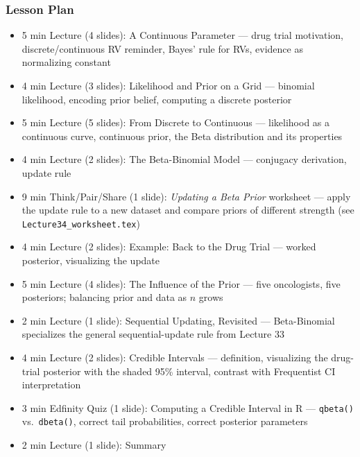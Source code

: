 \begin{frame}
    \frametitle{Lesson Plan}
    \begin{itemize}
        \item 5 min Lecture (4 slides): A Continuous Parameter --- drug trial motivation, discrete/continuous RV reminder, Bayes' rule for RVs, evidence as normalizing constant
        \item 4 min Lecture (3 slides): Likelihood and Prior on a Grid --- binomial likelihood, encoding prior belief, computing a discrete posterior
        \item 5 min Lecture (5 slides): From Discrete to Continuous --- likelihood as a continuous curve, continuous prior, the Beta distribution and its properties
        \item 4 min Lecture (2 slides): The Beta-Binomial Model --- conjugacy derivation, update rule
        \item 9 min Think/Pair/Share (1 slide): \textit{Updating a Beta Prior} worksheet --- apply the update rule to a new dataset and compare priors of different strength (see \texttt{Lecture34\_worksheet.tex})
        \item 4 min Lecture (2 slides): Example: Back to the Drug Trial --- worked posterior, visualizing the update
        \item 5 min Lecture (4 slides): The Influence of the Prior --- five oncologists, five posteriors; balancing prior and data as $n$ grows
        \item 2 min Lecture (1 slide): Sequential Updating, Revisited --- Beta-Binomial specializes the general sequential-update rule from Lecture 33
        \item 4 min Lecture (2 slides): Credible Intervals --- definition, visualizing the drug-trial posterior with the shaded 95\% interval, contrast with Frequentist CI interpretation
        \item 3 min Edfinity Quiz (1 slide): Computing a Credible Interval in R --- \texttt{qbeta()} vs.\ \texttt{dbeta()}, correct tail probabilities, correct posterior parameters
        \item 2 min Lecture (1 slide): Summary
    \end{itemize}
\end{frame}

